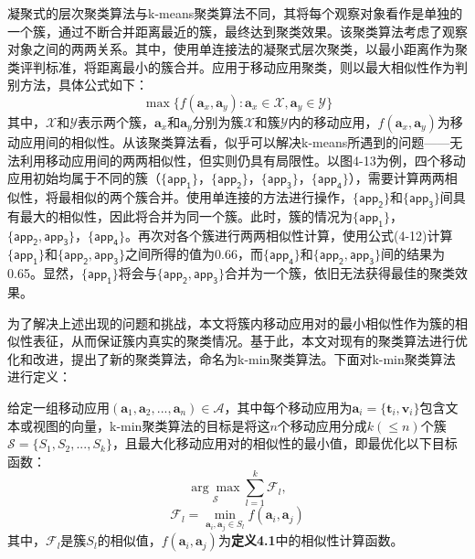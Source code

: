 凝聚式的层次聚类算法\cite{hierarchical}与k-means聚类算法不同，其将每个观察对象看作是单独的一个簇，通过不断合并距离最近的簇，最终达到聚类效果。该聚类算法考虑了观察对象之间的两两关系。其中，使用单连接法的凝聚式层次聚类，以最小距离作为聚类评判标准，将距离最小的簇合并。应用于移动应用聚类，则以最大相似性作为判别方法，具体公式如下：
\begin{equation}
\max \{ f(\mathbf{a}_x, \mathbf{a}_y) : \mathbf{a}_x \in \mathcal{X}, \mathbf{a}_y \in \mathcal{Y} \}
\end{equation}
其中，$\mathcal{X}$和$\mathcal{Y}$表示两个簇，$\mathbf{a}_x$和$\mathbf{a}_y$分别为簇$\mathcal{X}$和簇$\mathcal{Y}$内的移动应用，$f(\mathbf{a}_x, \mathbf{a}_y)$为移动应用间的相似性。从该聚类算法看，似乎可以解决k-means所遇到的问题——无法利用移动应用间的两两相似性，但实则仍具有局限性。以图4-13为例，四个移动应用初始均属于不同的簇（$\{\mathsf{app_1}\}$，$\{\mathsf{app_2}\}$，$\{\mathsf{app_3}\}$，$\{\mathsf{app_4}\}$），需要计算两两相似性，将最相似的两个簇合并。使用单连接的方法进行操作，$\{\mathsf{app_2}\}$和$\{\mathsf{app_3}\}$间具有最大的相似性，因此将合并为同一个簇。此时，簇的情况为$\{\mathsf{app_1}\}$，$\{\mathsf{app_2}, \mathsf{app_3}\}$，$\{\mathsf{app_4}\}$。再次对各个簇进行两两相似性计算，使用公式(4-12)计算$\{\mathsf{app_1}\}$和$\{\mathsf{app_2}, \mathsf{app_3}\}$之间所得的值为0.66，而$\{\mathsf{app_4}\}$和$\{\mathsf{app_2}, \mathsf{app_3}\}$间的结果为0.65。显然，$\{\mathsf{app_1}\}$将会与$\{\mathsf{app_2}, \mathsf{app_3}\}$合并为一个簇，依旧无法获得最佳的聚类效果。

为了解决上述出现的问题和挑战，本文将簇内移动应用对的最小相似性作为簇的相似性表征，从而保证簇内真实的聚类情况。基于此，本文对现有的聚类算法进行优化和改进，提出了新的聚类算法，命名为k-min聚类算法。下面对k-min聚类算法进行定义：
\begin{definition}[K-min聚类算法]
给定一组移动应用$(\mathbf{a}_1, \mathbf{a}_2, ..., \mathbf{a}_n) \in \mathcal{A}$，其中每个移动应用为$\mathbf{a}_i = \{\mathbf{t}_i, \mathbf{v}_i\}$包含文本或视图的向量，k-min聚类算法的目标是将这$n$个移动应用分成$k(\leq n)$个簇$\mathcal{S} = \{S_1, S_2, ..., S_k\}$，且最大化移动应用对的相似性的最小值，即最优化以下目标函数：
\begin{equation}
\underset{\mathcal{S}}{\arg \max} \sum_{l=1}^{k} \mathcal{F}_l,
\end{equation}
\begin{equation}
\mathcal{F}_l = \min_{\mathbf{a}_i, \mathbf{a}_j \in S_l} f(\mathbf{a}_i, \mathbf{a}_j)
\end{equation}
其中，$\mathcal{F}_l$是簇$S_l$的相似值，$f(\mathbf{a}_i, \mathbf{a}_j)$为\textbf{定义4.1}中的相似性计算函数。
\end{definition}

